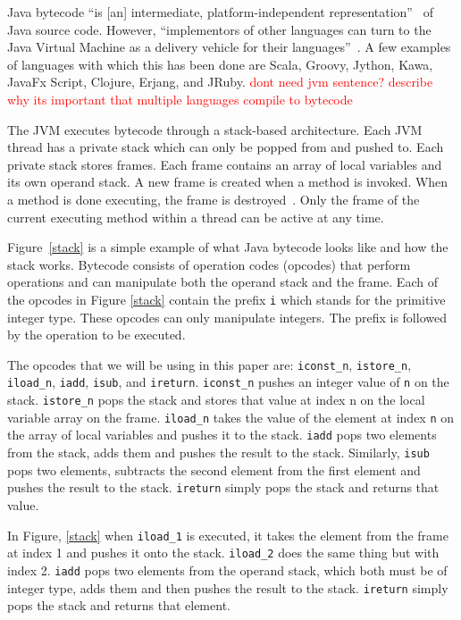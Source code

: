 \documentclass{sig-alternate}
\newcommand{\mycomment}[1]{\textcolor{red}{#1}}
\begin{document}
Java bytecode ``is [an] intermediate, platform-independent representation''~\cite{FINCH2:2009} of Java source code. However, ``implementors of other languages can turn to the Java Virtual Machine as a delivery vehicle for their languages''~\cite{JVMspec:2013}. A few examples of languages with which this has been done are Scala, Groovy, Jython, Kawa, JavaFx Script, Clojure, Erjang, and JRuby. \mycomment{dont need jvm sentence? describe why its important that multiple languages compile to bytecode}\par

The JVM executes bytecode through a stack-based architecture. Each JVM thread has a private stack which can only be popped from and pushed to. Each private stack stores frames. Each frame contains an array of local variables and its own operand stack. A new frame is created when a method is invoked. When a method is done executing, the frame is destroyed~\cite{Oracle:2013}. Only the frame of the current executing method within a thread can be active at any time.

Figure~\ref{stack} is a simple example of what Java bytecode looks like and how the stack works. Bytecode consists of operation codes (opcodes) that perform operations and can manipulate both the operand stack and the frame. Each of the opcodes in Figure \ref{stack} contain the prefix \texttt{i} which stands for the primitive integer type. These opcodes can only manipulate integers. The prefix is followed by the operation to be executed.\par 

The opcodes that we will be using in this paper are: \texttt{iconst\_n}, \texttt{istore\_n}, \texttt{iload\_n}, \texttt{iadd}, \texttt{isub}, and \texttt{ireturn}. \texttt{iconst\_n} pushes an integer value of \texttt{n} on the stack. \texttt{istore\_n} pops the stack and stores that value at index n on the local variable array on the frame. \texttt{iload\_n} takes the value of the element at index \texttt{n} on the array of local variables and pushes it to the stack. \texttt{iadd} pops two elements from the stack, adds them and pushes the result to the stack. Similarly, \texttt{isub} pops two elements, subtracts the second element from the first element and pushes the result to the stack. \texttt{ireturn} simply pops the stack and returns that value.

In Figure, \ref{stack} when \texttt{iload\_1} is executed, it takes the element from the frame at index 1 and pushes it onto the stack. \texttt{iload\_2} does the same thing but with index 2. \texttt{iadd} pops two elements from the operand stack, which both must be of integer type, adds them and then pushes the result to the stack. \texttt{ireturn} simply pops the stack and returns that element.
\end{document}
